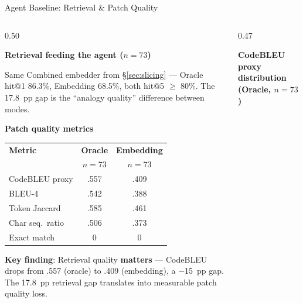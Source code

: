 \documentclass[aspectratio=169,10pt]{beamer}
\begin{document}
\begin{frame}{Agent Baseline: Retrieval \& Patch Quality}
\begin{columns}[T]
\begin{column}{0.50\textwidth}

  \textbf{Retrieval feeding the agent ($n{=}73$)}

  \vspace{0.3em}
  {\scriptsize
  Same Combined embedder from §\ref{sec:slicing} — Oracle hit@1 86.3\%,
  Embedding 68.5\%, both hit@5 $\geq$ 80\%.
  The 17.8~pp gap is the ``analogy quality'' difference between modes.}

  \vspace{0.6em}
  \textbf{Patch quality metrics}

  \vspace{0.4em}
  {\small
  \renewcommand{\arraystretch}{1.3}
  \begin{tabular}{lcc}
    \toprule
    \textbf{Metric} & \textbf{Oracle} & \textbf{Embedding} \\
    & {\scriptsize $n{=}73$} & {\scriptsize $n{=}73$} \\
    \midrule
    \rowcolor{c1!10}
    CodeBLEU proxy & .557  & .409 \\
    BLEU-4         & .542  & .388 \\
    Token Jaccard  & .585  & .461 \\
    Char seq.\ ratio & .506 & .373 \\
    Exact match    & 0     & 0 \\
    \bottomrule
  \end{tabular}}


  \vspace{0.3em}
  {\scriptsize
  \textbf{Key finding}: Retrieval quality \textbf{matters} —
  CodeBLEU drops from .557 (oracle) to .409 (embedding), a $-$15~pp gap.
  The 17.8~pp retrieval gap translates into measurable patch quality loss.}

\end{column}
\begin{column}{0.47\textwidth}

  \textbf{CodeBLEU proxy distribution (Oracle, $n{=}73$)}

  \vspace{0.3em}
  \centering


\end{column}
\end{columns}
\end{frame}
\end{document}
